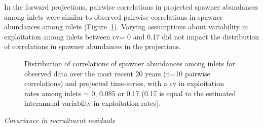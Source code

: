 \documentclass[11pt]{book}
\begin{document}
In the forward projections, pairwise correlations in projected spawner abundances among inlets were similar to observed pairwise correlations in spawner abundances among inlets (Figure~\ref{fig:chinook-boxplotscvER}). Varying assumptions about variability in exploitation among inlets between cv= 0 and 0.17 did not impact the distribution of correlations in spawner abundances in the projections.
\begin{figure}[htb]

{\centering {} 

}

\caption{Distribution of correlations of spawner abundances among inlets for observed data over the most recent 20 years (n=10 pairwise correlations) and projected time-series, with a cv in exploitation rates among inlets = 0, 0.085 or 0.17 (0.17 is equal to the estimated interannual variablity in exploitation rates). }\label{fig:chinook-boxplotscvER}
\end{figure}
\linebreak

\emph{Covariance in recruitment residuals}
\end{document}
